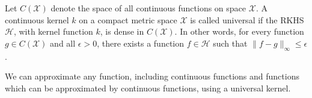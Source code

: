 \documentclass[lang=cn,10pt]{gorgeousnbook}
\numberwithin{equation}{section}%
\numberwithin{figure}{section}%
\begin{document}

\begin{definition}
Let $C(\mathcal{X})$ denote the space of all continuous functions on space $\mathcal{X}$. A continuous kernel $k$ on a compact metric space $\mathcal{X}$ is called universal if the RKHS $\mathcal{H}$, with kernel function $k$, is dense in $C(\mathcal{X})$. In other words, for every function $g \in C(\mathcal{X})$ and all $\epsilon > 0$, there exists a function $f \in \mathcal{H}$ such that $\|f - g\|_\infty \leq \epsilon$.
\end{definition}

\begin{remark}
We can approximate any function, including continuous functions and functions which can be approximated by continuous functions, using a universal kernel. 
\end{remark}
\end{document}

